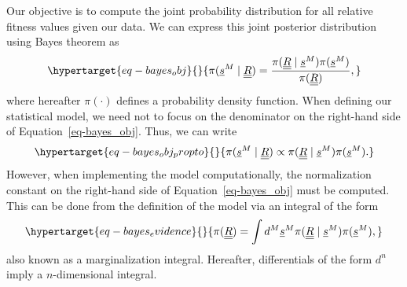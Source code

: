 \documentclass[
  letterpaper,
  DIV=11,
  numbers=noendperiod]{scrartcl}
\begin{document}
\begin{refsegment}
Our objective is to compute the joint probability distribution for all
relative fitness values given our data. We can express this joint
posterior distribution using Bayes theorem as
\begin{equation}\protect\hypertarget{eq-bayes_obj}{}{
\pi(\underline{s}^M \mid \underline{\underline{R}}) = \frac{
\pi(\underline{\underline{R}} \mid \underline{s}^M) 
\pi(\underline{s}^M)}
{\pi(\underline{\underline{R}})},
}\label{eq-bayes_obj}\end{equation} where hereafter \(\pi(\cdot)\)
defines a probability density function. When defining our statistical
model, we need not to focus on the denominator on the right-hand side of
Equation~\ref{eq-bayes_obj}. Thus, we can write
\begin{equation}\protect\hypertarget{eq-bayes_obj_propto}{}{
\pi(\underline{s}^M \mid \underline{\underline{R}}) \propto
\pi(\underline{\underline{R}} \mid \underline{s}^M) 
\pi(\underline{s}^M).
}\label{eq-bayes_obj_propto}\end{equation} However, when implementing
the model computationally, the normalization constant on the right-hand
side of Equation~\ref{eq-bayes_obj} must be computed. This can be done
from the definition of the model via an integral of the form
\begin{equation}\protect\hypertarget{eq-bayes_evidence}{}{
\pi(\underline{\underline{R}}) = \int d^M \underline{s}^M
\pi(\underline{\underline{R}} \mid \underline{s}^M) 
\pi(\underline{s}^M),
}\label{eq-bayes_evidence}\end{equation} also known as a marginalization
integral. Hereafter, differentials of the form \(d^n\) imply a
\(n\)-dimensional integral.


\end{refsegment}
\end{document}
